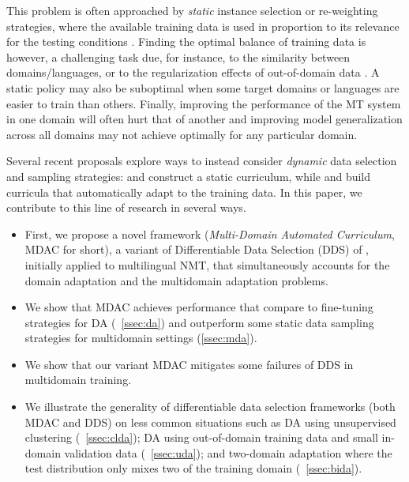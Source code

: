 \documentclass[11pt]{article}
\begin{document}
This problem is often approached by \emph{static} instance selection or re-weighting strategies, where the available training data is used in proportion to its relevance for the testing conditions \cite{Axelrod11domain}. Finding the optimal balance of training data is however, a challenging task due, for instance, to the similarity between domains/languages, or to the regularization effects of out-of-domain data \cite{Miceli-barone17regularization}. A static policy may also be suboptimal when some target domains or languages are easier to train than others. Finally, improving the performance of the MT system in one domain will often hurt that of another \cite{Vanderwees17dynamic,Britz17mixing} and improving model generalization across all domains \cite{koehn18findings} may not achieve optimally for any particular domain. 

Several recent proposals
explore ways to instead consider \emph{dynamic} data selection and sampling strategies:  and  construct a static curriculum, while  and  build curricula that automatically adapt to the training data. In this paper, we contribute to this line of research in several ways. 
\begin{itemize}
	\item First, we propose a novel framework (\emph{Multi-Domain Automated Curriculum}, MDAC for short), a variant of Differentiable Data Selection (DDS) of , initially applied to multilingual NMT, that simultaneously accounts for the domain adaptation and the multidomain adaptation problems.
	\item We show that MDAC achieves performance that compare to fine-tuning strategies for DA (\textsection~\ref{ssec:da}) and outperform some static data sampling strategies for multidomain settings (\ref{ssec:mda}).
	\item We show that our variant MDAC mitigates some failures of DDS in multidomain training.
	\item We illustrate the generality of differentiable data selection frameworks (both MDAC and DDS) on less common situations such as DA using unsupervised clustering (\textsection~\ref{ssec:clda}); DA using out-of-domain training data and small in-domain validation data (\textsection~\ref{ssec:uda}); and two-domain adaptation where the test distribution only mixes two of the training domain (\textsection~\ref{ssec:bida}).
\end{itemize}
\end{document}

